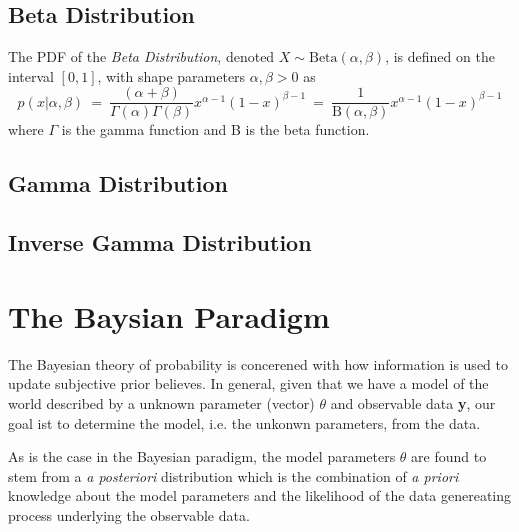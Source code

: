 \documentclass[11pt]{article}
\theoremstyle{plain}
\theoremstyle{definition}
\begin{document}
\subsection{Beta Distribution}
The PDF of the \textit{Beta Distribution}, denoted $X \sim \text{Beta}(\alpha, \beta)$, is defined on the interval $\left[0,1\right]$, with shape parameters $\alpha, \beta > 0$ as
\begin{equation}
p(x|\alpha,\beta) \ = \ \frac{(\alpha + \beta)}{\Gamma(\alpha)\Gamma(\beta)} x^{\alpha-1}(1-x)^{\beta-1} \ = \ \frac{1}{\text{B}(\alpha,\beta)} x^{\alpha-1}(1-x)^{\beta-1}
\end{equation}
where $\Gamma$ is the gamma function and B is the beta function.


\subsection{Gamma Distribution}


\subsection{Inverse Gamma Distribution}



\section{The Baysian Paradigm}
The Bayesian theory of probability is concerened with how information is used to update subjective prior believes. In general, given that we have a model of the world described by a unknown parameter (vector) $\theta$ and observable data \textbf{y}, our goal ist to determine the model, i.e. the unkonwn parameters, from the data.

As is the case in the Bayesian paradigm, the model parameters $\theta$ are found to stem from a \textit{a posteriori} distribution which is the combination of \textit{a priori} knowledge about the model parameters and the likelihood of the data genereating process underlying the observable data.
\end{document}
